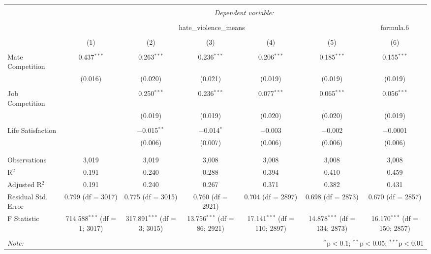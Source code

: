 
\begin{table}[!htbp] \centering 
  \caption{} 
  \label{} 
\begin{tabular}{@{\extracolsep{5pt}}lcccccc} 
\\[-1.8ex]\hline 
\hline \\[-1.8ex] 
 & \multicolumn{6}{c}{\textit{Dependent variable:}} \\ 
\cline{2-7} 
\\[-1.8ex] & \multicolumn{5}{c}{hate\_violence\_means} & formula.6 \\ 
\\[-1.8ex] & (1) & (2) & (3) & (4) & (5) & (6)\\ 
\hline \\[-1.8ex] 
 Mate Competition & 0.437$^{***}$ & 0.263$^{***}$ & 0.236$^{***}$ & 0.206$^{***}$ & 0.185$^{***}$ & 0.155$^{***}$ \\ 
  & (0.016) & (0.020) & (0.021) & (0.019) & (0.019) & (0.019) \\ 
  & & & & & & \\ 
 Job Competition &  & 0.250$^{***}$ & 0.236$^{***}$ & 0.077$^{***}$ & 0.065$^{***}$ & 0.056$^{***}$ \\ 
  &  & (0.019) & (0.019) & (0.020) & (0.020) & (0.019) \\ 
  & & & & & & \\ 
 Life Satisfaction &  & $-$0.015$^{**}$ & $-$0.014$^{*}$ & $-$0.003 & $-$0.002 & $-$0.0001 \\ 
  &  & (0.006) & (0.007) & (0.006) & (0.006) & (0.006) \\ 
  & & & & & & \\ 
\hline \\[-1.8ex] 
Observations & 3,019 & 3,019 & 3,008 & 3,008 & 3,008 & 3,008 \\ 
R$^{2}$ & 0.191 & 0.240 & 0.288 & 0.394 & 0.410 & 0.459 \\ 
Adjusted R$^{2}$ & 0.191 & 0.240 & 0.267 & 0.371 & 0.382 & 0.431 \\ 
Residual Std. Error & 0.799 (df = 3017) & 0.775 (df = 3015) & 0.760 (df = 2921) & 0.704 (df = 2897) & 0.698 (df = 2873) & 0.670 (df = 2857) \\ 
F Statistic & 714.588$^{***}$ (df = 1; 3017) & 317.891$^{***}$ (df = 3; 3015) & 13.756$^{***}$ (df = 86; 2921) & 17.141$^{***}$ (df = 110; 2897) & 14.878$^{***}$ (df = 134; 2873) & 16.170$^{***}$ (df = 150; 2857) \\ 
\hline 
\hline \\[-1.8ex] 
\textit{Note:}  & \multicolumn{6}{r}{$^{*}$p$<$0.1; $^{**}$p$<$0.05; $^{***}$p$<$0.01} \\ 
\end{tabular} 
\end{table} 
